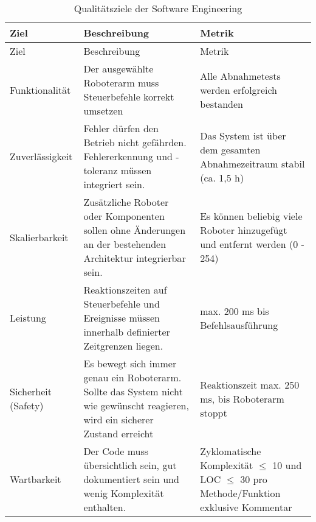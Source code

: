 \begin{longtable}{|>{\raggedright\arraybackslash}p{4cm}|>{\raggedright\arraybackslash}p{5cm}|>{\raggedright\arraybackslash}p{5cm}|}
	\caption{Qualitätsziele der Software Engineering} \label{tab:seziele} \\
	\hline
	Ziel & Beschreibung & Metrik \\
	\hline
	\endfirsthead
	
	\hline
	Ziel & Beschreibung & Metrik \\
	\hline
	\endhead
	
	\hline
	\endfoot
   
        Funktionalität &  
        Der ausgewählte Roboterarm muss Steuerbefehle korrekt umsetzen
        & Alle Abnahmetests werden erfolgreich bestanden
        \\
        \hline
        Zuverlässigkeit & 
        Fehler dürfen den Betrieb nicht gefährden. Fehlererkennung und -toleranz müssen integriert sein.
        & Das System ist über dem gesamten Abnahmezeitraum stabil (ca. 1,5 h)
        \\
        \hline
        Skalierbarkeit & 
        Zusätzliche Roboter oder Komponenten sollen ohne Änderungen an der bestehenden Architektur integrierbar sein. 
        & Es können beliebig viele Roboter hinzugefügt und entfernt werden (0 - 254)
        \\
        \hline
        Leistung & 
        Reaktionszeiten auf Steuerbefehle und Ereignisse müssen innerhalb definierter Zeitgrenzen liegen. 
        & max. 200 ms bis Befehlsausführung
        \\
        \hline
        Sicherheit (Safety) & 
        Es bewegt sich immer genau ein Roboterarm. Sollte das System nicht wie gewünscht reagieren, wird ein sicherer Zustand erreicht
        & Reaktionszeit max. 250 ms, bis Roboterarm stoppt
        \\
        \hline
        Wartbarkeit & 
        Der Code muss übersichtlich sein, gut dokumentiert sein und wenig Komplexität enthalten. 
        & Zyklomatische Komplexität $\leq$ 10 und LOC $\leq$ 30 pro Methode/Funktion exklusive Kommentar \\
        \hline

\end{longtable}
